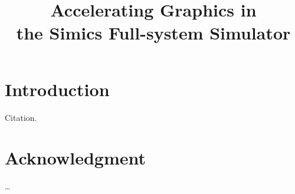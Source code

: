 \documentclass[conference]{IEEEtran}
\begin{document}
\title{%
  Accelerating Graphics in\\
  the Simics Full-system Simulator}

\author{
}

\maketitle



%
\IEEEpeerreviewmaketitle

\section{Introduction}
Citation\cite{IEEEexample:article_typical}.

\section*{Acknowledgment}
\ldots



\end{document}
